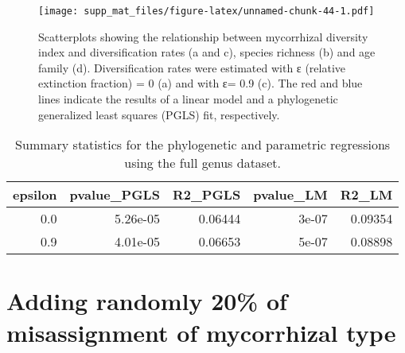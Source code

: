 \documentclass[]{article}
\begin{document}
\begin{figure}
\centering
\texttt{[image: supp\_mat\_files/figure-latex/unnamed-chunk-44-1.pdf]}
\caption{Scatterplots showing the relationship between mycorrhizal
diversity index and diversification rates (a and c), species richness
(b) and age family (d). Diversification rates were estimated with ε
(relative extinction fraction) = 0 (a) and with ε= 0.9 (c). The red and
blue lines indicate the results of a linear model and a phylogenetic
generalized least squares (PGLS) fit, respectively.}
\end{figure}

\begin{longtable}{r|r|r|r|r}
\caption{\label{tab:unnamed-chunk-45}Summary statistics for the phylogenetic and parametric regressions using the full genus dataset.}\\
\hline
epsilon & pvalue\_PGLS & R2\_PGLS & pvalue\_LM & R2\_LM\\
\hline
0.0 & 5.26e-05 & 0.06444 & 3e-07 & 0.09354\\
\hline
0.9 & 4.01e-05 & 0.06653 & 5e-07 & 0.08898\\
\hline
\end{longtable}

\hypertarget{adding-randomly-20-of-misassignment-of-mycorrhizal-type}{%
\section{Adding randomly 20\% of misassignment of mycorrhizal
type}\label{adding-randomly-20-of-misassignment-of-mycorrhizal-type}}
\end{document}
